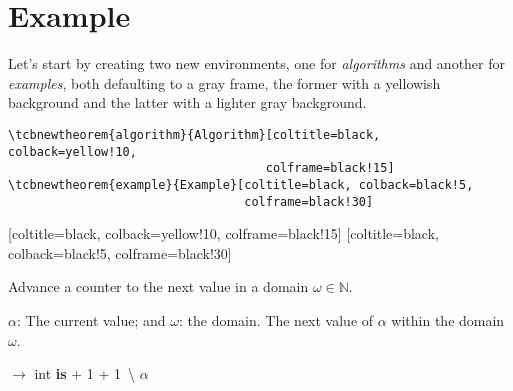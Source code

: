 \documentclass{article}
\begin{document}
\section{Example}
\label{sec:examples}

Let's start by creating two new environments, one for \emph{algorithms} and another for \emph{examples}, both defaulting to a gray frame, the former with a yellowish background and the latter with a lighter gray background.

\begin{verbatim}
\tcbnewtheorem{algorithm}{Algorithm}[coltitle=black, colback=yellow!10,
                                    colframe=black!15]
\tcbnewtheorem{example}{Example}[coltitle=black, colback=black!5,
                                 colframe=black!30]  
\end{verbatim}

[coltitle=black, colback=yellow!10, colframe=black!15]
[coltitle=black, colback=black!5, colframe=black!30]

\newcommand{\bracesemptyset}{\ensuremath{\lbrace\,\rbrace}}

\begin{tcbalgorithm}{Advance a counter to the next value in a domain $\omega \in \mathbb{N}$.}
  \label{alg:advance1}
\begin{algorithmic}[1]
  \Statex \Input $\alpha$: The current value; and $\omega$: the domain.
  \Statex \Output The next value of $\alpha$ within the domain $\omega$.

  \Vspace

   $\rightarrow$ int \textbf{is}
    \Let {\alpha} {\alpha + 1}
    \While{$\alpha \not\in \omega \And \omega \neq \bracesemptyset$}
      \Let {\alpha} {\alpha + 1}
    \EndWhile
    \If{$\omega \neq \bracesemptyset$}
      \Let {\omega} {\omega \,\backslash \lbrace \alpha \rbrace}
    \EndIf
    \State \Return $\alpha$
  \EndFunction
\end{algorithmic}
\end{tcbalgorithm}
\end{document}
